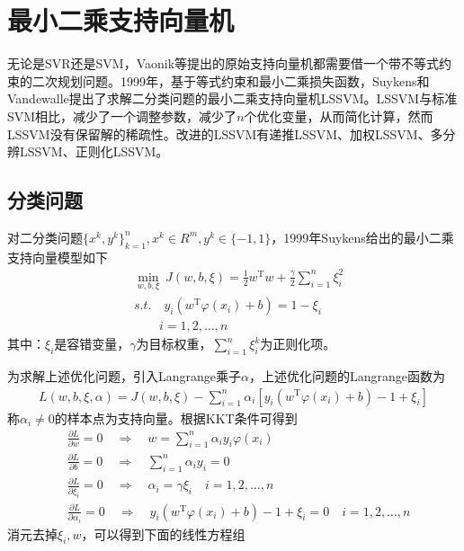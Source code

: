 \section{最小二乘支持向量机}
    \par
    无论是SVR还是SVM，Vaonik等提出的原始支持向量机都需要借一个带不等式约束的二次规划问题。1999年，基于等式约束和最小二乘损失函数，Suykens和Vandewalle提出了求解二分类问题的最小二乘支持向量机LSSVM。LSSVM与标准SVM相比，减少了一个调整参数，减少了$n$个优化变量，从而简化计算，然而LSSVM没有保留解的稀疏性。改进的LSSVM有递推LSSVM、加权LSSVM、多分辨LSSVM、正则化LSSVM。
    \subsection{分类问题}
        \par
        对二分类问题$\{x^k,y^k\}_{k=1}^n,x^k\in R^m,y^k\in \{-1,1\}$，1999年Suykens给出的最小二乘支持向量模型如下
        \begin{align*}
        & \min_{w,b,\xi}\ J(w,b,\xi) = \frac{1}{2}w^\mathrm{T}w+\frac{\gamma}{2}\sum_{i=1}^n \xi_i^2\\
        & s.t.\quad y_i(w^\mathrm{T}\varphi(x_i)+b) = 1-\xi_i\\
        &\qquad  i=1,2,\dots,n
        \end{align*}
        其中：$\xi_i$是容错变量，$\gamma$为目标权重，$\sum\limits_{i=1}^n\xi_i^k$为正则化项。
        \par
        为求解上述优化问题，引入Langrange乘子$\alpha$，上述优化问题的Langrange函数为
        \begin{align*}
        L(w,b,\xi,\alpha) = J(w,b,\xi) - \sum_{i=1}^n \alpha_i [y_i(w^\mathrm{T}\varphi(x_i)+b)-1+\xi_i]
        \end{align*}
        称$\alpha_i \neq 0$的样本点为支持向量。根据KKT条件可得到
        \begin{align*}
        & \frac{\partial L}{\partial w} = 0 \quad \Rightarrow\quad w = \sum_{i=1}^n\alpha_iy_i\varphi(x_i)\\
        & \frac{\partial L}{\partial b}=0 \quad \Rightarrow \quad\sum_{i=1}^n \alpha_iy_i = 0\\
        & \frac{\partial L}{\partial \xi_i} = 0\quad \Rightarrow \quad\alpha_i = \gamma \xi_i\quad i=1,2,\dots,n\\
        & \frac{\partial L}{\partial \alpha_i} = 0\quad \Rightarrow \quad y_i(w^\mathrm{T}\varphi(x_i)+b)-1+\xi_i = 0\quad i=1,2,\dots,n
        \end{align*}
        消元去掉$\xi_i,w$，可以得到下面的线性方程组
